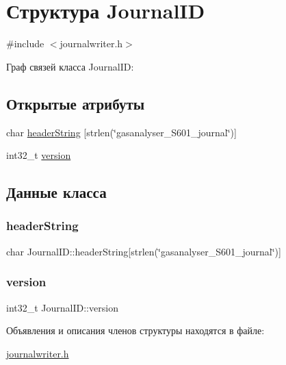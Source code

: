 \hypertarget{struct_journal_i_d}{}\section{Структура Journal\+ID}
\label{struct_journal_i_d}


{\ttfamily \#include $<$journalwriter.\+h$>$}



Граф связей класса Journal\+ID\+:
\subsection*{Открытые атрибуты}
\begin{DoxyCompactItemize}
\item 
char \hyperlink{struct_journal_i_d_a5130c248f0573438dbcef7bcfa37b9f3}{header\+String} \mbox{[}strlen(\char`\"{}gasanalyser\+\_\+\+S601\+\_\+journal\char`\"{})\mbox{]}
\item 
int32\+\_\+t \hyperlink{struct_journal_i_d_a9c3b1be1f5d693879f1aa98a83aa9e21}{version}
\end{DoxyCompactItemize}


\subsection{Данные класса}
\mbox{\label{struct_journal_i_d_a5130c248f0573438dbcef7bcfa37b9f3}} 
\subsubsection{\texorpdfstring{header\+String}{headerString}}
{\footnotesize\ttfamily char Journal\+I\+D\+::header\+String\mbox{[}strlen(\char`\"{}gasanalyser\+\_\+\+S601\+\_\+journal\char`\"{})\mbox{]}}

\mbox{\label{struct_journal_i_d_a9c3b1be1f5d693879f1aa98a83aa9e21}} 
\subsubsection{\texorpdfstring{version}{version}}
{\footnotesize\ttfamily int32\+\_\+t Journal\+I\+D\+::version}



Объявления и описания членов структуры находятся в файле\+:\begin{DoxyCompactItemize}
\item 
\hyperlink{journalwriter_8h}{journalwriter.\+h}\end{DoxyCompactItemize}
